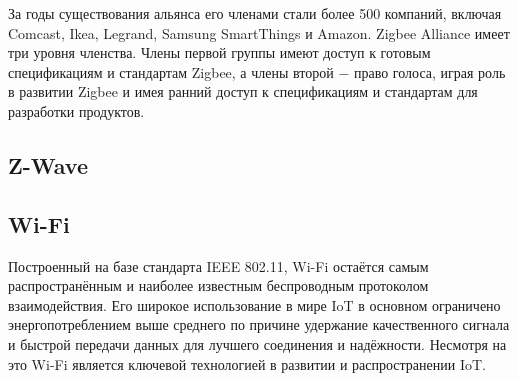 	За годы существования альянса его членами стали более 500 компаний, включая Comcast, Ikea, Legrand, 
	Samsung SmartThings и Amazon. Zigbee Alliance имеет три уровня членства. Члены первой группы 
	имеют доступ к готовым спецификациям и стандартам Zigbee, а члены второй $-$ право голоса, 
	играя роль в развитии Zigbee и имея ранний доступ к спецификациям и стандартам для разработки 
	продуктов.
	
	
	\subsection{Z-Wave}
	
	
	\subsection{Wi-Fi}
	Построенный на базе стандарта IEEE 802.11, Wi-Fi остаётся самым распространённым и наиболее
	известным беспроводным протоколом взаимодействия. Его широкое использование в мире IoT в
	основном ограничено энергопотреблением выше среднего по причине удержание качественного сигнала
	и быстрой передачи данных для лучшего соединения и надёжности. Несмотря на это Wi-Fi является
	ключевой технологией в развитии и распространении IoT.
	
	
	